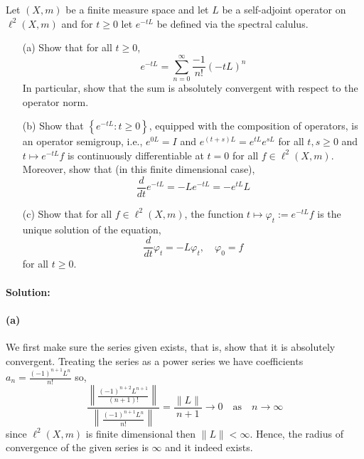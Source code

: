 Let $(X,m)$ be a finite measure space and let $L$ be a self-adjoint operator on $\ell^{2}(X,m)$ and for $t\geq 0$ let $e^{-tL}$ be defined via the spectral calulus.
\begin{itemize}
	\item [(a)]
		Show that for all $t\geq 0$,
		\begin{equation*}
			e^{-tL} = \sum_{n=0}^{\infty}\frac{-1}{n!}(-tL)^{n}
		\end{equation*}
		In particular, show that the sum is absolutely convergent with respect to the operator norm.
	\item [(b)]
		Show that $\left\{e^{-tL} \colon t\geq 0\right\}$, equipped with the composition of operators, is an operator semigroup, i.e., $e^{0L}=I$ and $e^{(t+s)L}=e^{tL}e^{sL}$ for all $t,s\geq 0$ and $t\mapsto e^{-tL}f$ is continuously differentiable at $t=0$ for all $f\in\ell^{2}(X,m)$. Moreover, show that (in this finite dimensional case),
		\begin{equation*}
			\frac{d}{dt}e^{-tL} = -Le^{-tL} = -e^{tL}L
		\end{equation*}
	\item [(c)]
		Show that for all $f\in\ell^{2}(X,m)$, the function $t\mapsto \varphi_{t}:=e^{-tL}f$ is the unique solution of the equation,
		\begin{equation*}
			\frac{d}{dt}\varphi_{t} = -L\varphi_{t}, \quad \varphi_{0}=f
		\end{equation*}
		for all $t\geq 0$.
\end{itemize}

\paragraph{Solution:}

\paragraph{(a)}
We first make sure the series given exists, that is, show that it is absolutely convergent. Treating the series as a power series we have coefficients $a_{n}=\frac{(-1)^{n+1}L^{n}}{n!}$ so,
\begin{equation*}
	\frac{\left\|\frac{(-1)^{n+2}L^{n+1}}{(n+1)!}\right\|}{\left\|\frac{(-1)^{n+1}L^{n}}{n!}\right\|} = \frac{\|L\|}{n+1}\to 0 \quad \text{as} \quad n\to\infty
\end{equation*}
since $\ell^{2}(X,m)$ is finite dimensional then $\|L\|<\infty$. Hence, the radius of convergence of the given series is $\infty$ and it indeed exists.

